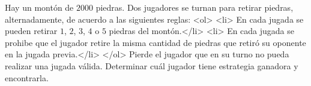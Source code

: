 Hay un montón de $2000$ piedras. Dos jugadores se turnan para retirar piedras, alternadamente, de acuerdo a las siguientes reglas:
<ol>
  <li> En cada jugada se pueden retirar $1$, $2$, $3$, $4$ o $5$ piedras del montón.</li>
  <li> En cada jugada se prohibe que el jugador retire la misma cantidad de piedras que retiró su oponente en la jugada previa.</li>
</ol>
Pierde el jugador que en su turno no pueda realizar una jugada válida. Determinar cuál jugador tiene estrategia ganadora y encontrarla.
